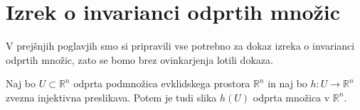 \documentclass[mat1]{fmfdelo}
\newcommand{\R}{\mathbb R}
\newcommand{\0}{\underline{0}}
\begin{document}
\section{Izrek o invarianci odprtih množic}\label{raz:ioiom}
V prejšnjih poglavjih smo si pripravili vse potrebno za dokaz izreka o invarianci odprtih množic, zato se bomo brez ovinkarjenja lotili dokaza.



\begin{izrek}\label{izr:main-theorem}
Naj bo $U \subset \R^n$ odprta podmnožica evklidskega prostora $\R^n$ in naj bo $h : U \rightarrow \R^n$ zvezna injektivna preslikava.
Potem je tudi slika $h(U)$ odprta množica v $\R^n$.
\end{izrek}
\end{document}
